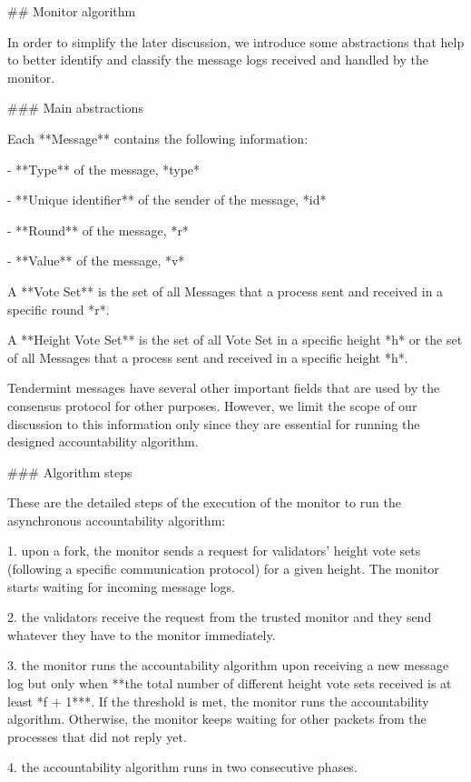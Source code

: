\documentclass[a4paper,11pt,oneside]{report}
\begin{document}
\begin{markdown}

## Monitor algorithm

In order to simplify the later discussion, we introduce some abstractions that help to better identify and classify the message logs received and handled by the monitor.

### Main abstractions

Each **Message** contains the following information:

- **Type** of the message, *type*

- **Unique identifier** of the sender of the message, *id*

- **Round** of the message, *r*

- **Value** of the message, *v*

A **Vote Set** is the set of all Messages that a process sent and received in a specific round *r*.

A **Height Vote Set** is the set of all Vote Set in a specific height *h* or the set of all Messages that a process sent and received in a specific height *h*.

Tendermint messages have several other important fields that are used by the consensus protocol for other purposes. However, we limit the scope of our discussion to this information only since they are essential for running the designed accountability algorithm.       

### Algorithm steps
 
These are the detailed steps of the execution of the monitor to run the asynchronous accountability algorithm: 
 
1. upon a fork, the monitor sends a request for validators' height vote sets (following a specific communication protocol) for a given height. The monitor starts waiting for incoming message logs.

2. the validators receive the request from the trusted monitor and they send whatever they have to the monitor immediately. 

3. the monitor runs the accountability algorithm upon receiving a new message log but only when **the total number of different height vote sets received is at least *f + 1***. 
If the threshold is met, the monitor runs the accountability algorithm. Otherwise, the monitor keeps waiting for other packets from the processes that did not reply yet. 
      
4. the accountability algorithm runs in two consecutive phases.


\end{markdown}
\end{document}

